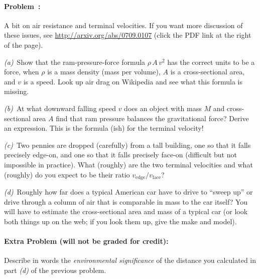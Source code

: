 \documentclass[12pt]{article}
\begin{document}
\paragraph{Problem~\theproblem:}%
A bit on air resistance and terminal velocities. If you want more
discussion of these issues, see \url{http://arxiv.org/abs/0709.0107}
(click the PDF link at the right of the page).

\textsl{(a)}~Show that the ram-pressure-force formula $\rho\,A\,v^2$ has the
correct units to be a force, when $\rho$ is a mass density (mass per volume),
$A$ is a cross-sectional area, and $v$ is a speed. Look up air drag on
Wikipedia and see what this formula is missing.

\textsl{(b)}~At what downward falling speed $v$ does an object with
mass $M$ and cross-sectional area $A$ find that ram pressure balances
the gravitational force? Derive an expression. This is the formula
(ish) for the terminal velocity!

\textsl{(c)}~Two pennies are dropped (carefully) from a tall building,
one so that it falls precisely edge-on, and one so that it falls
precisely face-on (difficult but not impossible in practice).  What
(roughly) are the two terminal velocities and what (roughly) do you expect to be
their ratio $v_{\mathrm{edge}}/v_{\mathrm{face}}$?

\textsl{(d)}~Roughly how far does a typical American car have to drive
to ``sweep up'' or drive through a column of air that is comparable in
mass to the car itself?  You will have to estimate the
cross-sectional area and mass of a typical car (or look both things
up on the web; if you look them up, give the make and model).

\paragraph{Extra Problem (will not be graded for credit):}%
Describe in words the \emph{environmental significance} of the
distance you calculated in part \textsl{(d)} of the previous problem.
\end{document}
